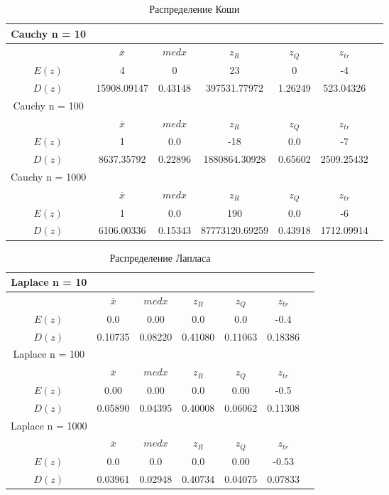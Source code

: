 \documentclass[12pt,a4paper]{scrartcl}
\begin{document}
\begin{table}[H]
  \centering
  \begin{tabular}{ | c | c | c | c | c | c | c | }
	\hline
	Cauchy n = 10 & & & & &  \\ \hline
         & $\overline x$& $med x$& $z_R $ & $z_Q $  &  $z_{tr}$  \\ \hline
         $E(z)$ & 4 & 0 & 23 & 0 & -4 \\ \hline
         $D(z)$ & 15908.09147 & 0.43148 & 397531.77972 & 1.26249 & 523.04326 \\ \hline

Cauchy n = 100 & & & & &  \\ \hline
         & $\overline x$& $med x$& $z_R $ & $z_Q $  &  $z_{tr}$  \\ \hline
         $E(z)$ & 1 & 0.0 & -18 & 0.0 & -7 \\ \hline
         $D(z)$ & 8637.35792 & 0.22896 & 1880864.30928 & 0.65602 & 2509.25432 \\ \hline

Cauchy n = 1000 & & & & &  \\ \hline
         & $\overline x$& $med x$& $z_R $ & $z_Q $  &  $z_{tr}$  \\ \hline
         $E(z)$ & 1& 0.0 & 190 & 0.0 & -6 \\ \hline
         $D(z)$ & 6106.00336 & 0.15343 & 87773120.69259 & 0.43918 & 1712.09914 \\ \hline
	\end{tabular}
  \label{table:cauchy_table}
\caption{Распределение Коши}
\end{table}

\begin{table}[H]
  \centering
  \begin{tabular}{ | c | c | c | c | c | c | c | }
	\hline
Laplace n = 10 & & & & &  \\ \hline
         & $\overline x$& $med x$& $z_R $ & $z_Q $  &  $z_{tr}$  \\ \hline
         $E(z)$ & 0.0 & 0.00 & 0.0 & 0.0 & -0.4 \\ \hline
         $D(z)$ & 0.10735 & 0.08220 & 0.41080 & 0.11063 & 0.18386 \\ \hline

Laplace n = 100 & & & & &  \\ \hline
         & $\overline x$& $med x$& $z_R $ & $z_Q $  &  $z_{tr}$  \\ \hline
         $E(z)$ & 0.00 & 0.00 & 0.0 & 0.00 & -0.5 \\ \hline
         $D(z)$ & 0.05890 & 0.04395 & 0.40008 & 0.06062 & 0.11308 \\ \hline

Laplace n = 1000 & & & & &  \\ \hline
         & $\overline x$& $med x$& $z_R $ & $z_Q $  &  $z_{tr}$  \\ \hline
         $E(z)$ & 0.0 & 0.0 & 0.0 & 0.00 & -0.53 \\ \hline
         $D(z)$ & 0.03961 & 0.02948 & 0.40734 & 0.04075 & 0.07833 \\ \hline
	\end{tabular}
  \label{table:laplace_table}
\caption{Распределение Лапласа}
\end{table}
\end{document}
